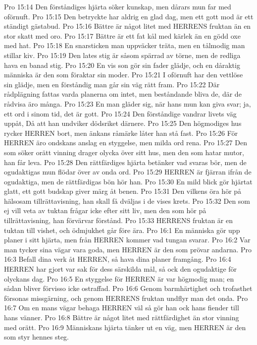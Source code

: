 Pro 15:14  Den förståndiges hjärta söker kunskap, men dårars mun far med oförnuft.
Pro 15:15  Den betryckte har aldrig en glad dag, men ett gott mod är ett ständigt gästabud.
Pro 15:16  Bättre är något litet med HERRENS fruktan än en stor skatt med oro.
Pro 15:17  Bättre är ett fat kål med kärlek än en gödd oxe med hat.
Pro 15:18  En snarsticken man uppväcker träta, men en tålmodig man stillar kiv.
Pro 15:19  Den lates stig är såsom spärrad av törne, men de redliga hava en banad stig.
Pro 15:20  En vis son gör sin fader glädje, och en dåraktig människa är den som föraktar sin moder.
Pro 15:21  I oförnuft har den vettlöse sin glädje, men en förståndig man går sin väg rätt fram.
Pro 15:22  Där rådplägning fattas varda planerna om intet, men beståndande bliva de, där de rådvisa äro många.
Pro 15:23  En man gläder sig, när hans mun kan giva svar; ja, ett ord i sinom tid, det är gott.
Pro 15:24  Den förståndige vandrar livets väg uppåt, Då att han undviker dödsriket därnere.
Pro 15:25  Den högmodiges hus rycker HERREN bort, men änkans råmärke låter han stå fast.
Pro 15:26  För HERREN äro ondskans anslag en styggelse, men milda ord rena.
Pro 15:27  Den som söker orätt vinning drager olycka över sitt hus, men den som hatar mutor, han får leva.
Pro 15:28  Den rättfärdiges hjärta betänker vad svaras bör, men de ogudaktigas mun flödar över av onda ord.
Pro 15:29  HERREN är fjärran ifrån de ogudaktiga, men de rättfärdigas bön hör han.
Pro 15:30  En mild blick gör hjärtat glatt, ett gott budskap giver märg åt benen.
Pro 15:31  Den vilkens öra hör på hälsosam tillrättavisning, han skall få dväljas i de vises krets.
Pro 15:32  Den som ej vill veta av tuktan frågar icke efter sitt liv, men den som hör på tillrättavisning, han förvärvar förstånd.
Pro 15:33  HERRENS fruktan är en tuktan till vishet, och ödmjukhet går före ära.
Pro 16:1  En människa gör upp planer i sitt hjärta, men från HERREN kommer vad tungan svarar.
Pro 16:2  Var man tycker sina vägar vara goda, men HERREN är den som prövar andarna.
Pro 16:3  Befall dina verk åt HERREN, så hava dina planer framgång.
Pro 16:4  HERREN har gjort var sak för dess särskilda mål, så ock den ogudaktige för olyckans dag.
Pro 16:5  En styggelse för HERREN är var högmodig man; en sådan bliver förvisso icke ostraffad.
Pro 16:6  Genom barmhärtighet och trofasthet försonas missgärning, och genom HERRENS fruktan undflyr man det onda.
Pro 16:7  Om en mans vägar behaga HERREN väl så gör han ock hans fiender till hans vänner.
Pro 16:8  Bättre är något litet med rättfärdighet än stor vinning med orätt.
Pro 16:9  Människans hjärta tänker ut en väg, men HERREN är den som styr hennes steg.
